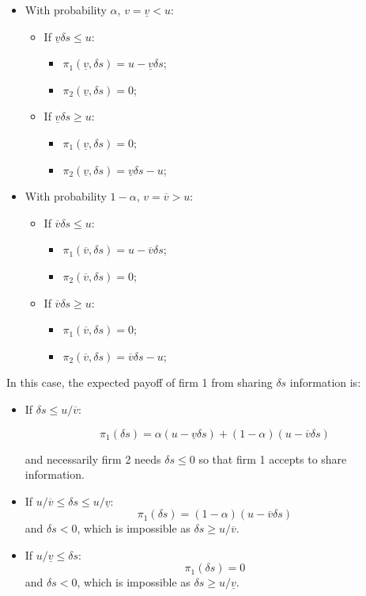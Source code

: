 \documentclass[a4paper,leqno]{article}%
\renewcommand{\a}{\alpha}
\newcommand{\uv}{\underline{v}}
\newcommand{\ov}{\overline{v}}
\begin{document}
\begin{itemize}
    \item With probability $\a$, $v=\uv<u$:
\begin{itemize}
    \item If $\uv \delta s\leq u$:
\begin{itemize}
    \item $\pi_1(\uv,\delta s)=u-\uv \delta s$;
    \item $\pi_2(\uv,\delta s)=0$;
\end{itemize}    
    \item If $\uv \delta s\geq u$:
\begin{itemize}
    \item $\pi_1(\uv,\delta s)=0$;
    \item $\pi_2(\uv,\delta s)=\uv\delta s-u$;
\end{itemize}
\end{itemize}
    \item With probability $1-\a$, $v=\ov>u$:
\begin{itemize}
    \item If $\ov \delta s\leq u$:
\begin{itemize}
    \item $\pi_1(\ov,\delta s)=u-\ov \delta s$;
    \item $\pi_2(\ov,\delta s)=0$;
\end{itemize}    
    \item If $\ov \delta s\geq u$:
\begin{itemize}
    \item $\pi_1(\ov,\delta s)=0$;
    \item $\pi_2(\ov,\delta s)=\ov\delta s-u$;
\end{itemize}
\end{itemize}
\end{itemize}

In this case, the expected payoff of firm 1 from sharing $\delta s$ information is:

\begin{itemize}
    \item If $\delta s\leq u/\ov$:
    
    $$\pi_1(\delta s)=\a(u-\uv \delta s)+(1-\a)(u-\ov \delta s)$$
    
    and necessarily  firm 2 needs $\delta s\leq0$ so that firm 1 accepts to share information.
    \item If $u/\ov\leq \delta s\leq u/\uv$:
    $$\pi_1(\delta s)=(1-\a)(u-\ov \delta s)$$
    and $\delta s<0$, which is impossible as $\delta s\geq u/\ov$.
    \item If $u/\uv\leq \delta s$:
    $$\pi_1(\delta s)=0$$
    and $\delta s<0$, which is impossible as $\delta s\geq u/\uv$.
\end{itemize}
\end{document}
